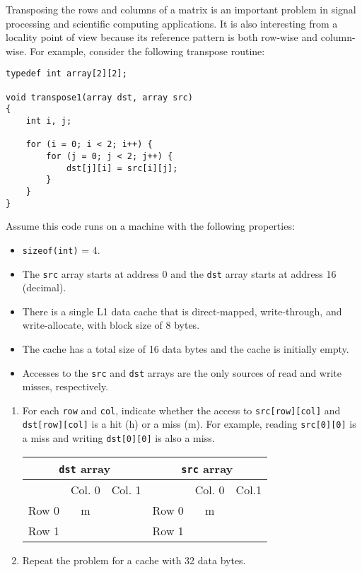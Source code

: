 \documentclass[12pt]{article}
\newenvironment{ex}[2][Exercise]{\begin{trivlist}
		\item[\hskip \labelsep {\bfseries #1}\hskip \labelsep {\bfseries #2.}]}{\end{trivlist}}
\begin{document}
\begin{ex}{6.17}
	Transposing the rows and columns of a matrix is an important problem in signal processing
	and scientific computing applications. It is also interesting from a locality point of view
	because its reference pattern is both row-wise and column-wise. For example, consider
	the following transpose routine:
	\begin{lstlisting}
typedef int array[2][2];

void transpose1(array dst, array src)
{
	int i, j;
	
	for (i = 0; i < 2; i++) {
		for (j = 0; j < 2; j++) {
			dst[j][i] = src[i][j];
		}
	}
}
	\end{lstlisting}
	Assume this code runs on a machine with the following properties:
	\begin{itemize}
		\item \texttt{sizeof(int)} = 4.
		\item The \texttt{src} array starts at address 0 and the \texttt{dst} array starts
		at address 16 (decimal).
		\item There is a single L1 data cache that is direct-mapped, write-through, and
		write-allocate, with block size of 8 bytes.
		\item The cache has a total size of 16 data bytes and the cache is initially empty.
		\item Accesses to the \texttt{src} and \texttt{dst} arrays are the only sources of read
		and write misses, respectively.
	\end{itemize}
	\begin{enumerate}[label=(\alph*)]
		\item For each \texttt{row} and \texttt{col}, indicate whether the access to
		\texttt{src[row][col]} and \texttt{dst[row][col]} is a hit (h) or a miss (m). For
		example, reading \texttt{src[0][0]} is a miss and writing \texttt{dst[0][0]} is
		also a miss.
		\begin{center}
			\begin{tabular}{ccc|ccc}
				\multicolumn{3}{c}{\texttt{dst} array} & \multicolumn{3}{c}{\texttt{src} array}\\
				\hline
				{} & Col. 0 & Col. 1 & {} & Col. 0 & Col.1\\
				\hline
				Row 0 & m & \makebox[1cm]{\hrulefill} & Row 0 & m & \makebox[1cm]{\hrulefill}\\
				Row 1 & \makebox[1cm]{\hrulefill} & \makebox[1cm]{\hrulefill} & Row 1 & \makebox[1cm]{\hrulefill} & \makebox[1cm]{\hrulefill}
			\end{tabular}
		\end{center}
		\item Repeat the problem for a cache with 32 data bytes.
	\end{enumerate}
\end{ex}
\end{document}
